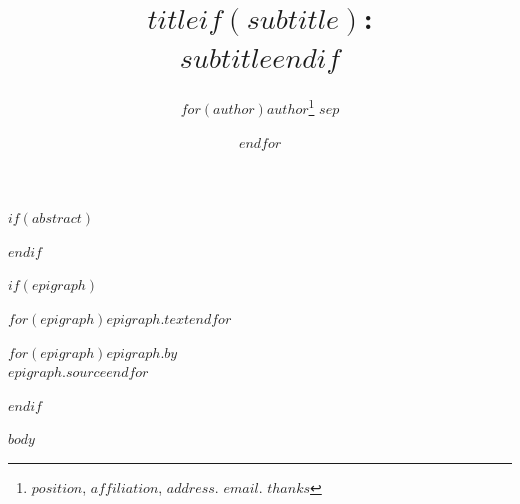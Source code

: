 \documentclass[12pt,letterpaper,twoside]{article}
\title{\Large\textbf{{$title$}$if(subtitle)$:\\ $subtitle$}$endif$}
\author{$for(author)$\normalsize{$author$}\thanks{$position$, $affiliation$, $address$. $email$. $thanks$} $sep$ \and $endfor$}
\date{}
\begin{document}
\maketitle

$if(abstract)$
\begin{abstract}
\footnotesize
{}
\end{abstract}
$endif$

$if(epigraph)$
\epigraph{{$for(epigraph)$\itshape{$epigraph.text$}$endfor$}}%
{$for(epigraph)${$epigraph.by$}\\ {$epigraph.source$}$endfor$}
$endif$

\singlespacing

$body$
\end{document}
